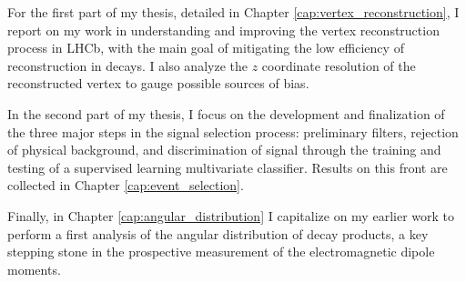 For the first part of my thesis, detailed in Chapter \ref{cap:vertex_reconstruction}, I report on my work in understanding and improving the vertex reconstruction process in LHCb, with the main goal of mitigating the low efficiency of \lambdadecay reconstruction in \demonstratorshort decays.
I also analyze the $z$ coordinate resolution of the reconstructed \lz vertex to gauge possible sources of bias.

In the second part of my thesis, I focus on the development and finalization of the three major steps in the signal selection process: preliminary filters, rejection of \physbkgshort physical background,
and discrimination of signal through the training and testing of a supervised learning multivariate classifier.
Results on this front are collected in Chapter \ref{cap:event_selection}.

Finally, in Chapter \ref{cap:angular_distribution} I capitalize on my earlier work to perform a first analysis of the angular distribution of \lambdadecay decay products, a key stepping stone in the prospective measurement of the \lz electromagnetic dipole moments.